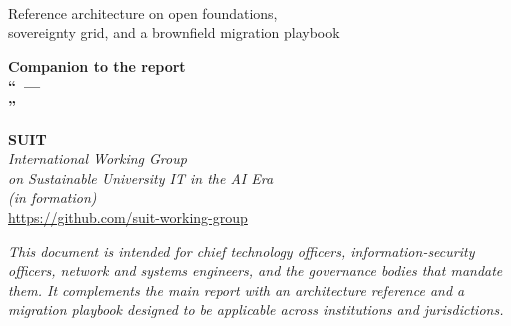 \documentclass[11pt,a4paper,twoside]{book}
\begin{document}
\hypersetup{pageanchor=false}
\begin{titlepage}
\centering
\vspace*{0.5cm}

{\suittitlelogo}

\vspace{0.8cm}

{\Huge\bfseries \suitsolutiontitle}

\vspace{0.5cm}
{\LARGE\itshape \suitsolutionsubtitlemain\\\suitsolutionsubtitlerest}

\vspace{0.9cm}

\suiteditionline

\vspace{0.9cm}
{\large Reference architecture on open foundations,\\sovereignty grid, and a brownfield migration playbook}

\vspace{1.6cm}

\begin{tcolorbox}[
    colback=NavyBlue!8!white,
    colframe=NavyBlue!85!black,
    boxrule=1.2pt,
    arc=3pt,
    left=12pt, right=12pt, top=8pt, bottom=8pt,
    width=0.88\textwidth,
    halign=center
]
{\large\bfseries Companion to the report\\
``\suitpolicytitle\ ---\\
\suitpolicysubtitle''}
\end{tcolorbox}

\vspace{1cm}
\suitmetablock

\vspace{0.9cm}

\begin{minipage}{0.85\textwidth}
\centering
{\large\bfseries SUIT}\\[3pt]
{\normalsize\itshape International Working Group\\on Sustainable University IT in the AI Era}\\[4pt]
{\small\itshape (in formation)}\\[10pt]
{\small \url{https://github.com/suit-working-group}}
\end{minipage}

\vfill

\begin{minipage}{0.85\textwidth}
\centering\small\itshape
This document is intended for chief technology officers, information-security
officers, network and systems engineers, and the governance bodies that
mandate them. It complements the main report with an architecture reference
and a migration playbook designed to be applicable across institutions and
jurisdictions.
\end{minipage}


\end{titlepage}
\end{document}
